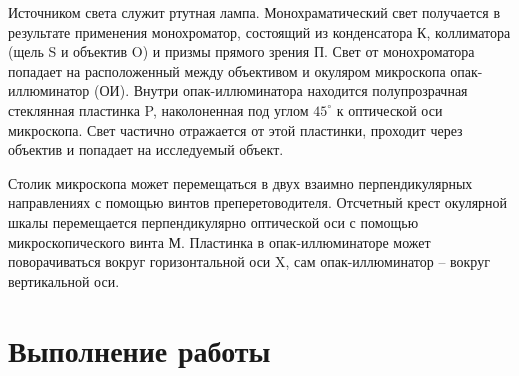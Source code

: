 \documentclass[a4paper, 12pt]{article}%
\begin{document}
Источником света служит ртутная лампа. Монохраматический свет получается в результате применения монохроматор, состоящий из конденсатора К, коллиматора (щель S и объектив O) и призмы прямого зрения П. Свет от монохроматора попадает на расположенный между объективом и окуляром микроскопа опак-иллюминатор (ОИ). Внутри опак-иллюминатора находится полупрозрачная стеклянная пластинка P, наколоненная под углом $45^{\circ}$ к оптической оси микроскопа. Свет частично отражается от этой пластинки, проходит через объектив и попадает на исследуемый объект.

Столик микроскопа может перемещаться в двух взаимно перпендикулярных направлениях с помощью винтов преперетоводителя. Отсчетный крест окулярной шкалы перемещается перпендикулярно оптической оси с помощью микроскопического винта М. Пластинка в опак-иллюминаторе может поворачиваться вокруг горизонтальной оси X, сам опак-иллюминатор  -- вокруг вертикальной оси.

\section*{Выполнение работы}
\end{document}
